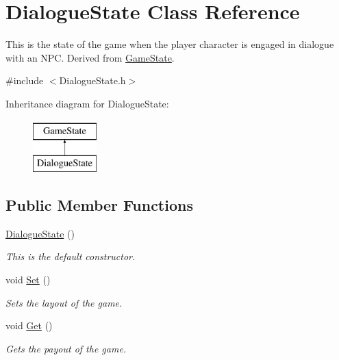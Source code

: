 \hypertarget{classDialogueState}{\section{Dialogue\-State Class Reference}
\label{classDialogueState}
}


This is the state of the game when the player character is engaged in dialogue with an N\-P\-C. Derived from \hyperlink{classGameState}{Game\-State}.  




{\ttfamily \#include $<$Dialogue\-State.\-h$>$}

Inheritance diagram for Dialogue\-State\-:\begin{figure}[H]
\begin{center}
\leavevmode
\includegraphics[height=2.000000cm]{classDialogueState}
\end{center}
\end{figure}
\subsection*{Public Member Functions}
\begin{DoxyCompactItemize}
\item 
\hypertarget{classDialogueState_a622d0916c1329a5e13675e4d7aff3b79}{\hyperlink{classDialogueState_a622d0916c1329a5e13675e4d7aff3b79}{Dialogue\-State} ()}\label{classDialogueState_a622d0916c1329a5e13675e4d7aff3b79}

\begin{DoxyCompactList}\small\item\em This is the default constructor. \end{DoxyCompactList}\item 
\hypertarget{classDialogueState_a203e463dc924a2492db74b749b81b9f1}{void \hyperlink{classDialogueState_a203e463dc924a2492db74b749b81b9f1}{Set} ()}\label{classDialogueState_a203e463dc924a2492db74b749b81b9f1}

\begin{DoxyCompactList}\small\item\em Sets the layout of the game. \end{DoxyCompactList}\item 
\hypertarget{classDialogueState_ab2f436b23d15e13cda1d756b8d47a982}{void \hyperlink{classDialogueState_ab2f436b23d15e13cda1d756b8d47a982}{Get} ()}\label{classDialogueState_ab2f436b23d15e13cda1d756b8d47a982}

\begin{DoxyCompactList}\small\item\em Gets the payout of the game. \end{DoxyCompactList}\end{DoxyCompactItemize}

